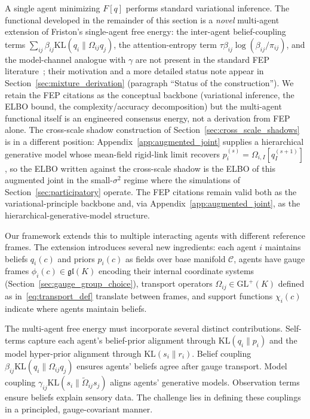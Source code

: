 \documentclass[11pt]{article}
\begin{document}
A single agent minimizing $F[q]$ performs standard variational inference. The functional developed in the remainder of this section is a \emph{novel} multi-agent extension of Friston's single-agent free energy: the inter-agent belief-coupling terms $\sum_{ij}\beta_{ij}\mathrm{KL}(q_i\|\Omega_{ij}q_j)$, the attention-entropy term $\tau\beta_{ij}\log(\beta_{ij}/\pi_{ij})$, and the model-channel analogue with $\gamma$ are not present in the standard FEP literature~\cite{Friston2010, parr2022active}; their motivation and a more detailed status note appear in Section~\ref{sec:mixture_derivation} (paragraph ``Status of the construction''). We retain the FEP citations as the conceptual backbone (variational inference, the ELBO bound, the complexity/accuracy decomposition) but the multi-agent functional itself is an engineered consensus energy, not a derivation from FEP alone. The cross-scale shadow construction of Section~\ref{sec:cross_scale_shadows} is in a different position: Appendix~\ref{app:augmented_joint} supplies a hierarchical generative model whose mean-field rigid-link limit recovers $p_i^{(s)} = \Omega_{i,I}[q_I^{(s+1)}]$, so the ELBO written against the cross-scale shadow is the ELBO of this augmented joint in the small-$\sigma^2$ regime where the simulations of Section~\ref{sec:participatory} operate. The FEP citations remain valid both as the variational-principle backbone and, via Appendix~\ref{app:augmented_joint}, as the hierarchical-generative-model structure.

Our framework extends this to multiple interacting agents with different reference frames. The extension introduces several new ingredients: each agent $i$ maintains beliefs $q_i(c)$ and priors $p_i(c)$ as fields over base manifold $\mathcal{C}$, agents have gauge frames $\phi_i(c) \in \mathfrak{gl}(K)$ encoding their internal coordinate systems (Section~\ref{sec:gauge_group_choice}), transport operators $\Omega_{ij} \in \mathrm{GL}^+(K)$ defined as in~\eqref{eq:transport_def} translate between frames, and support functions $\chi_i(c)$ indicate where agents maintain beliefs.

The multi-agent free energy must incorporate several distinct contributions. Self-terms capture each agent's belief-prior alignment through $\mathrm{KL}(q_i \| p_i)$ and the model hyper-prior alignment through $\mathrm{KL}(s_i \| r_i)$. Belief coupling $\beta_{ij}\mathrm{KL}(q_i\|\Omega_{ij}q_j)$ ensures agents' beliefs agree after gauge transport. Model coupling $\gamma_{ij}\mathrm{KL}(s_i\|\tilde{\Omega}_{ij}s_j)$ aligns agents' generative models. Observation terms ensure beliefs explain sensory data. The challenge lies in defining these couplings in a principled, gauge-covariant manner.
\end{document}
